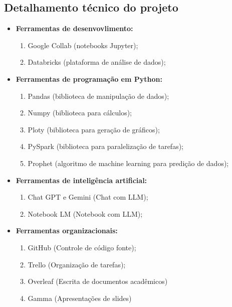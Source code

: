 \documentclass{article}
\begin{document}
\subsection{Detalhamento técnico do projeto}

\begin{itemize}
    \item \textbf{Ferramentas de desenvovlimento:}
        \begin{enumerate}
            \item Google Collab (notebooks Jupyter);
            \item Databricks (plataforma de análise de dados);
        \end{enumerate}
    \item \textbf{Ferramentas de programação em Python:}
        \begin{enumerate}
            \item Pandas (biblioteca de manipulação de dados);
            \item Numpy (biblioteca para cálculos);
            \item Ploty (biblioteca para geração de gráficos);
            \item PySpark (biblioteca para paralelização de tarefas);
            \item Prophet (algoritmo de machine learning para predição de dados);
        \end{enumerate}
    \item \textbf{Ferramentas de inteligência artificial:}
        \begin{enumerate}
            \item Chat GPT e Gemini (Chat com LLM);
            \item Notebook LM (Notebook com LLM);
        \end{enumerate}
    \item \textbf{Ferramentas organizacionais:}
        \begin{enumerate}
            \item GitHub (Controle de código fonte);
            \item Trello (Organização de tarefas);
            \item Overleaf (Escrita de documentos acadêmicos)
            \item Gamma (Apresentações de slides)
        \end{enumerate}
    
\end{itemize}
\end{document}
